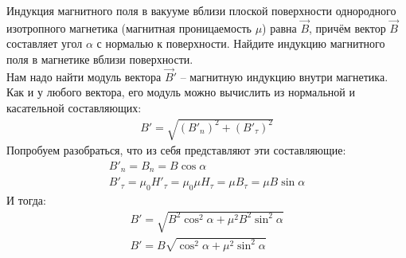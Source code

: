 \documentclass[__main__.tex]{subfiles}
\begin{document}
Индукция магнитного поля в вакууме вблизи плоской поверхности однородного изотропного магнетика (магнитная проницаемость $\mu$) равна $\vec{B}$, причём вектор $\vec{B}$ составляет угол $\alpha$ с нормалью к поверхности. Найдите индукцию магнитного поля в магнетике вблизи поверхности.\\ 

Нам надо найти модуль вектора $\vec{B}'$ -- магнитную индукцию внутри магнетика. Как и у любого вектора, его модуль можно вычислить из нормальной и касательной составляющих:
\begin{gather*}
B'=\sqrt{(B'_n)^2+(B'_\tau)^2}
\end{gather*}
Попробуем разобраться, что из себя представляют эти составляющие:
\begin{gather*}
B'_n=B_n=B\cos\alpha \\
B'_\tau=\mu_0H'_\tau=\mu_0\mu H_\tau=\mu B_\tau=\mu B\sin\alpha
\end{gather*}
И тогда:
\begin{gather*}
B'=\sqrt{B^2\cos^2\alpha+\mu^2B^2\sin^2\alpha}\\
B'=B\sqrt{\cos^2\alpha+\mu^2\sin^2\alpha}
\end{gather*}
\end{document}
